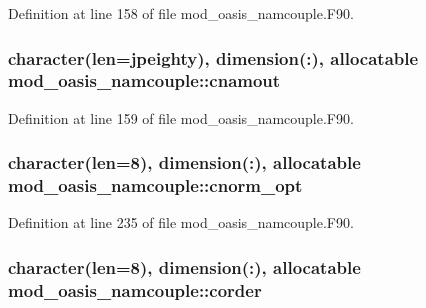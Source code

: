 Definition at line 158 of file mod\+\_\+oasis\+\_\+namcouple.\+F90.

\hypertarget{classmod__oasis__namcouple_a71ba84b9a7a813ca2551bcde99a0b5b5}{
\subsubsection[{cnamout}]{\setlength{\rightskip}{0pt plus 5cm}character(len={\bf jpeighty}), dimension(\+:), allocatable mod\+\_\+oasis\+\_\+namcouple\+::cnamout\hspace{0.3cm}{\ttfamily [private]}}}\label{classmod__oasis__namcouple_a71ba84b9a7a813ca2551bcde99a0b5b5}


Definition at line 159 of file mod\+\_\+oasis\+\_\+namcouple.\+F90.

\hypertarget{classmod__oasis__namcouple_a205e8ba5863c6bf6de5c8450fb060c7a}{
\subsubsection[{cnorm\+\_\+opt}]{\setlength{\rightskip}{0pt plus 5cm}character(len=8), dimension(\+:), allocatable mod\+\_\+oasis\+\_\+namcouple\+::cnorm\+\_\+opt\hspace{0.3cm}{\ttfamily [private]}}}\label{classmod__oasis__namcouple_a205e8ba5863c6bf6de5c8450fb060c7a}


Definition at line 235 of file mod\+\_\+oasis\+\_\+namcouple.\+F90.

\hypertarget{classmod__oasis__namcouple_a070f65b97986d1075f1deed9224cd89b}{
\subsubsection[{corder}]{\setlength{\rightskip}{0pt plus 5cm}character(len=8), dimension(\+:), allocatable mod\+\_\+oasis\+\_\+namcouple\+::corder\hspace{0.3cm}{\ttfamily [private]}}}\label{classmod__oasis__namcouple_a070f65b97986d1075f1deed9224cd89b}


